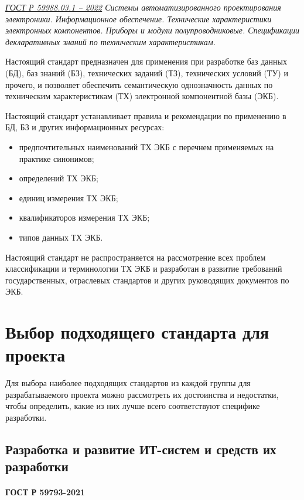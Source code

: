 \emph{\href{https://docs.cntd.ru/document/1200195155}{ГОСТ Р 59988.03.1 -- 2022}
Системы автоматизированного проектирования электроники.
Информационное обеспечение.
Технические характеристики электронных компонентов.
Приборы и модули полупроводниковые.
Спецификации декларативных знаний по техническим характеристикам.
}

Настоящий стандарт предназначен для применения при разработке
баз данных (БД), баз знаний (БЗ), технических заданий (ТЗ),
технических условий (ТУ) и прочего,
и позволяет обеспечить семантическую однозначность данных
по техническим характеристикам (ТХ) электронной компонентной базы (ЭКБ).

Настоящий стандарт устанавливает правила и рекомендации
по применению в БД, БЗ и других информационных ресурсах:

\begin{itemize}
	\item предпочтительных наименований ТХ ЭКБ
		с перечнем применяемых на практике синонимов;
	\item определений ТХ ЭКБ;
	\item единиц измерения ТХ ЭКБ;
	\item квалификаторов измерения ТХ ЭКБ;
	\item типов данных ТХ ЭКБ.
\end{itemize}

Настоящий стандарт не распространяется на рассмотрение
всех проблем классификации и терминологии ТХ ЭКБ
и разработан в развитие требований государственных, отраслевых стандартов
и других руководящих документов по ЭКБ.

\clearpage

\section{Выбор подходящего стандарта для проекта}

Для выбора наиболее подходящих стандартов из каждой группы
для разрабатываемого проекта можно рассмотреть их достоинства и недостатки,
чтобы определить, какие из них лучше всего соответствуют специфике разработки.

\subsection{Разработка и развитие ИТ-систем и средств их разработки}

\paragraph{ГОСТ Р 59793-2021}

